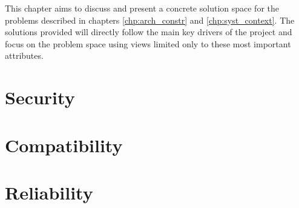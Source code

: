 This chapter aims to discuss and present a concrete solution space for the problems described in chapters \ref{chp:arch_constr} and  \ref{chp:syst_context}. The solutions provided will directly follow the main key drivers of the project and focus on the problem space using views limited only to these most important attributes.

\section{Security}

\section{Compatibility}

\section{Reliability}